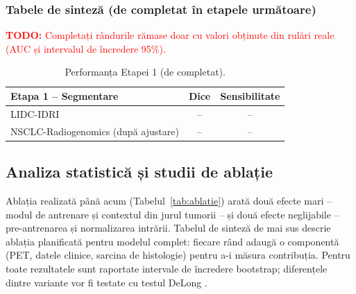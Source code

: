 \documentclass[11pt, a4paper]{article}
\newcommand{\todo}[1]{\textcolor{red}{\textbf{TODO:} #1}}
\begin{document}
\subsubsection{Tabele de sinteză (de completat în etapele următoare)}
\todo{Completați rândurile rămase doar cu valori obținute din rulări reale (AUC și intervalul de încredere 95\%).}

\begin{table}[h]
\centering
\small
\begin{tabular}{@{}lcc@{}}
\toprule
\textbf{Etapa 1 -- Segmentare} & \textbf{Dice} & \textbf{Sensibilitate} \\ \midrule
LIDC-IDRI & -- & -- \\
NSCLC-Radiogenomics (după ajustare) & -- & -- \\ \bottomrule
\end{tabular}
\caption{Performanța Etapei 1 (de completat).}
\end{table}

\begin{table}[h]
\centering
\small
{}
\caption{Performanța clasificării (Etapa 2 a pipeline-ului) și ablația planificată pentru modelul complet (de completat). Histologie: adenocarcinom vs.\ scuamos, NSCLC-Radiogenomics, validare încrucișată în 5 fold-uri. $^{*}$Modelul B rezolvă altă problemă (4 clase, imagini 2D fără identificatori de pacient); vezi Tabelul~\ref{tab:model_b}.}
\end{table}

\subsection{Analiza statistică și studii de ablație}
Ablația realizată până acum (Tabelul~\ref{tab:ablatie}) arată două efecte mari -- modul de antrenare și contextul din jurul tumorii -- și două efecte neglijabile -- pre-antrenarea și normalizarea intrării. Tabelul de sinteză de mai sus descrie ablația planificată pentru modelul complet: fiecare rând adaugă o componentă (PET, datele clinice, sarcina de histologie) pentru a-i măsura contribuția. Pentru toate rezultatele sunt raportate intervale de încredere bootstrap; diferențele dintre variante vor fi testate cu testul DeLong \cite{delong1988}.
\end{document}
